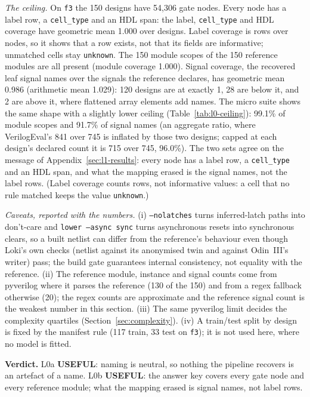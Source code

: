 \documentclass[conference]{IEEEtran}
\newcommand{\verdict}[1]{\textbf{\textsc{#1}}}
\newcommand{\hev}[1]{\par\smallskip\noindent\textbf{#1}}
\newcommand{\code}[1]{\texttt{#1}}
\begin{document}
\emph{The ceiling.} On \code{f3} the 150 designs have 54,306 gate nodes. Every node has a
label row, a \code{cell\_type} and an HDL span: the label, \code{cell\_type} and HDL coverage
have geometric mean 1.000 over designs. Label coverage is rows over nodes, so it shows that a row
exists, not that its fields are informative; unmatched cells stay \code{unknown}. The 150 module scopes of the 150 reference modules are
all present (module coverage 1.000). Signal coverage, the recovered leaf signal names over
the signals the reference declares, has geometric mean 0.986 (arithmetic mean 1.029): 120
designs are at exactly 1, 28 are below it, and 2 are above it, where flattened array elements
add names. The micro suite shows the same shape with a slightly lower ceiling (Table~\ref{tab:l0-ceiling}):
99.1\% of module scopes and 91.7\% of signal names (an aggregate ratio, where VerilogEval's
841 over 745 is inflated by those two designs; capped at each design's declared count it is
715 over 745, 96.0\%). The two sets agree on the message of
Appendix~\ref{sec:l1-results}: every node has a label row, a \code{cell\_type} and an HDL span,
and what the mapping erased is the signal names, not the label rows. (Label coverage counts rows,
not informative values: a cell that no rule matched keeps the value \code{unknown}.)

\emph{Caveats, reported with the numbers.} (i) \code{--nolatches} turns inferred-latch paths
into don't-care and \code{lower --async sync} turns asynchronous resets into synchronous clears,
so a built netlist can differ from the reference's behaviour even though Loki's own checks
(netlist against its anonymised twin and against Odin~III's writer) pass; the build gate
guarantees internal consistency, not equality with the reference. (ii) The reference module,
instance and signal counts come from pyverilog where it parses the reference (130 of the 150)
and from a regex fallback otherwise (20); the regex counts are approximate and the
reference signal count is the weakest number in this section. (iii) The same pyverilog limit
decides the complexity quartiles (Section~\ref{sec:complexity}). (iv) A train/test split by
design is fixed by the manifest rule (117 train, 33 test on \code{f3}); it is not used here,
where no model is fitted.

\hev{Verdict.} L0a \verdict{USEFUL}: naming is neutral, so nothing the pipeline recovers is an
artefact of a name. L0b \verdict{USEFUL}: the answer key covers every gate node and every reference
module; what the mapping erased is signal names, not label rows.
\end{document}
